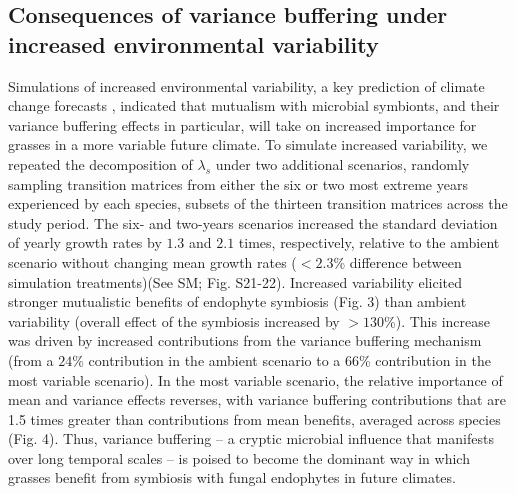 \documentclass[9pt,twocolumn,twoside]{pnas-new}
\begin{document}
\subsection*{Consequences of variance buffering under increased environmental variability} Simulations of increased environmental variability, a key prediction of climate change forecasts \cite{ipcc_2021}, indicated that mutualism with microbial symbionts, and their variance buffering effects in particular, will take on increased importance for grasses in a more variable future climate.
To simulate increased variability, we repeated the decomposition of $\lambda_s$ under two additional scenarios, randomly sampling transition matrices from either the six or two most extreme years experienced by each species, subsets of the thirteen transition matrices across the study period. 
The six- and two-years scenarios increased the standard deviation of yearly growth rates by $1.3$ and $2.1$ times, respectively, relative to the ambient scenario without changing mean growth rates ($<2.3$\% difference between simulation treatments)(See SM; Fig. S21-22).
Increased variability elicited stronger mutualistic benefits of endophyte symbiosis (Fig. 3) than ambient variability (overall effect of the symbiosis increased by $>130 $\%).
This increase was driven by increased contributions from the variance buffering mechanism (from a $24$\% contribution in the ambient scenario to a $66$\% contribution in the most variable scenario).
In the most variable scenario, the relative importance of mean and variance effects reverses, with variance buffering contributions that are 1.5 times greater than contributions from mean benefits, averaged across species (Fig. 4). 
Thus, variance buffering -- a cryptic microbial influence that manifests over long temporal scales -- is poised to become the dominant way in which grasses benefit from symbiosis with fungal endophytes in future climates. 
\end{document}
